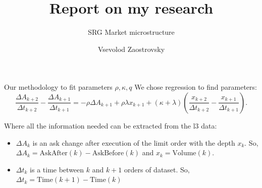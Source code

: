 \documentclass[aspectratio=169]{beamer}
\title{Report on my research}
\subtitle{SRG Market microstructure}
\author{Vsevolod Zaostrovsky}
\institute{Vega Institute Foundation}
\begin{document}
\maketitle

\begin{frame}{Our methodology to fit parameters $\rho, \kappa, q$}
    We chose regression to find parameters:                                                                                                                                                                                                                                                                                                                                                                                       
            \begin{equation*}
                \frac{\Delta A_{k+2}}{\Delta t_{k+2}} - \frac{\Delta A_{k+1}}{\Delta t_{k+1}} 
        = - \rho \Delta A_{k+1} + \rho \lambda x_{k+1} + (\kappa + \lambda) (\frac{x_{k+2}}{\Delta t_{k+2}} - \frac{x_{k+1}}{\Delta t_{k+1}}).
            \end{equation*}

        Where all the information needed can be extracted from the l3 data: 
        \begin{itemize}
            \item $\Delta A_{k}$ is an ask change after execution of the limit order with the depth $x_k$.
            So, $\Delta A_{k} = \textrm{AskAfter}(k) - \textrm{AskBefore}(k)$ and $x_k = \textrm{Volume}(k)$.
            \item $\Delta t_{k}$ is a time between $k$ and $k + 1$ orders of dataset. So, $\Delta t_{k} = \textrm{Time}(k+1) - \textrm{Time}(k)$
        \end{itemize}
\end{frame}
\end{document}
